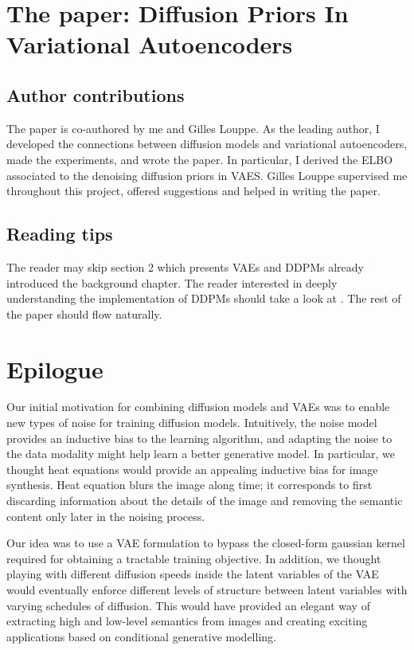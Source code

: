 \section{The paper: Diffusion Priors In Variational Autoencoders}

\subsection{Author contributions}
The paper is co-authored by me and Gilles Louppe. As the leading author, I developed the connections between diffusion models and variational autoencoders, made the experiments, and wrote the paper. In particular, I derived the ELBO associated to the denoising diffusion priors in VAES. Gilles Louppe supervised me throughout this project, offered suggestions and helped in writing the paper.

\subsection{Reading tips}
The reader may skip section 2 which presents VAEs and DDPMs already introduced the background chapter. The reader interested in deeply understanding the implementation of DDPMs should take a look at \citet{ho_denoising_2020}. The rest of the paper should flow naturally.




\section{Epilogue}

Our initial motivation for combining diffusion models and VAEs was to enable new types of noise for training diffusion models. Intuitively, the noise model provides an inductive bias to the learning algorithm, and adapting the noise to the data modality might help learn a better generative model. In particular, we thought heat equations would provide an appealing inductive bias for image synthesis. Heat equation blurs the image along time; it corresponds to first discarding information about the details of the image and removing the semantic content only later in the noising process.

Our idea was to use a VAE formulation to bypass the closed-form gaussian kernel required for obtaining a tractable training objective. In addition, we thought playing with different diffusion speeds inside the latent variables of the VAE would eventually enforce different levels of structure between latent variables with varying schedules of diffusion. This would have provided an elegant way of extracting high and low-level semantics from images and creating exciting applications based on conditional generative modelling.

